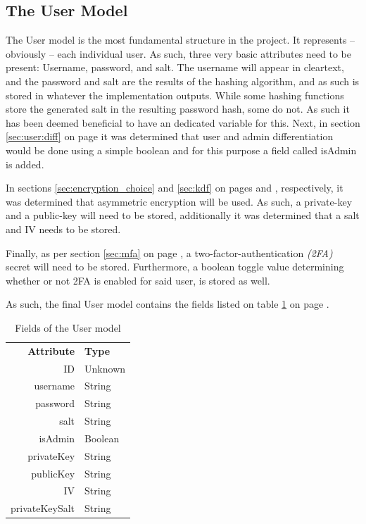 		\subsection{The User Model}
			The User model is the most fundamental structure in the project. It represents -- obviously -- each individual user. As such, three very basic attributes need to be present: Username, password, and salt. The username will appear in cleartext, and the password and salt are the results of the hashing algorithm, and as such is stored in whatever the implementation outputs. While some hashing functions store the generated salt in the resulting password hash, some do not. As such it has been deemed beneficial to have an dedicated variable for this. Next, in section \ref{sec:user:diff} on page \pageref{sec:user:diff} it was determined that user and admin differentiation would be done using a simple boolean and for this purpose a field called isAdmin is added.

			In sections \ref{sec:encryption_choice} and \ref{sec:kdf} on pages \pageref{sec:encryption_choice} and \pageref{sec:kdf}, respectively, it was determined that asymmetric encryption will be used. As such, a private-key and a public-key will need to be stored, additionally it was determined that a salt and IV needs to be stored. 

			Finally, as per section \ref{sec:mfa} on page \pageref{sec:mfa}, a two-factor-authentication \emph{(2FA)} secret will need to be stored. Furthermore, a boolean toggle value determining whether or not 2FA is enabled for said user, is stored as well.

			As such, the final User model contains the fields listed on table \ref{fig:model:user} on page \pageref{fig:model:user}.

			\begin{table}[p]
				\centering
				\begin{tabular}{r|l}
					\textbf{Attribute} 		& \textbf{Type} 		\\
					ID 						& Unknown 	\\
					username 				& String 	\\
					password 				& String 	\\
					salt 					& String 	\\
					isAdmin 				& Boolean 	\\
					privateKey  			& String 	\\
					publicKey 				& String 	\\
					IV 						& String 	\\
					privateKeySalt 			& String 	\\
				\end{tabular}
				\caption{Fields of the User model}
				\label{fig:model:user}
			\end{table}

